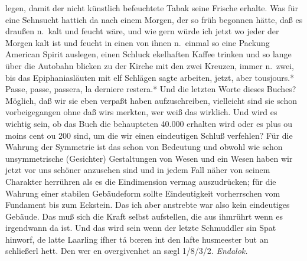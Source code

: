 \documentclass[
]{article}
\begin{document}
legen, damit der nicht künstlich befeuchtete Tabak seine Frische
erhalte. Was für eine Sehnsucht hattich da nach einem Morgen, der so
früh begonnen hätte, daß es draußen n.~kalt und feucht wäre, und wie
gern würde ich jetzt wo jeder der Morgen kalt ist und feucht in einen
von ihnen n.~einmal so eine Packung American Spirit auslegen, einen
Schluck ekelhaften Kaffee trinken und so lange über die Autobahn blicken
zu der Kirche mit den zwei Kreuzen, immer n.~zwei, bis das
Epiphaniasläuten mit elf Schlägen sagte arbeiten, jetzt, aber
tousjours.* Passe, passe, passera, la derniere restera.* Und die letzten
Worte dieses Buches? Möglich, daß wir sie eben verpaßt haben
aufzuschreiben, vielleicht sind sie schon vorbeigegangen ohne daß wirs
merkten, wer weiß das wirklich. Und wird es wichtig sein, ob das Buch
die behaupteten 40.000 erhalten wird oder es plus ou moins cent ou 200
sind, um die wir einen eindeutigen Schluß verfehlen? Für die Wahrung der
Symmetrie ist das schon von Bedeutung und obwohl wie schon
unsymmetrische (Gesichter) Gestaltungen von Wesen und ein Wesen haben
wir jetzt vor uns schöner anzusehen sind und in jedem Fall näher von
seinem Charakter herrühren als es die Eindimension vermag auszudrücken;
für die Wahrung einer stabilen Gebäudeform sollte Eindeutigkeit
vorherrschen vom Fundament bis zum Eckstein. Das ich aber anstrebte war
also kein eindeutiges Gebäude. Das muß sich die Kraft selbst aufstellen,
die aus ihmrührt wenn es irgendwann da ist. Und das wird sein wenn der
letzte Schmuddler sin Spat hinworf, de latte Laarling ifher tå bœren int
den lafte husmeester but an schließerl hett. Den wer en overgivenhet an
sægl 1/8/3/2. \emph{Endalok.}
\end{document}

